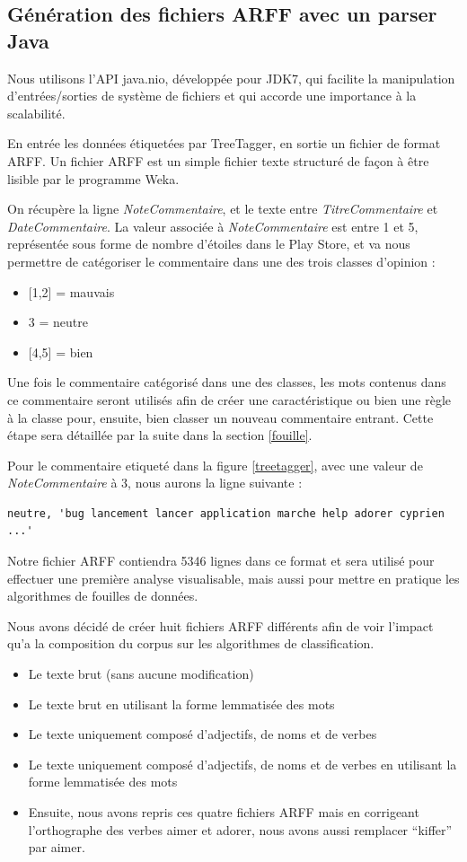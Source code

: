 \documentclass[a4paper, 11pt]{article}
\begin{document}
\subsection{Génération des fichiers ARFF avec un parser Java}
 
Nous utilisons l'API java.nio, développée pour JDK7, qui facilite la manipulation d'entrées/sorties de système de fichiers et qui accorde une importance à la scalabilité.
 
En entrée les données étiquetées par TreeTagger, en sortie un fichier de format ARFF. Un fichier ARFF est un simple fichier texte structuré de façon à être lisible par le programme Weka.

On récupère la ligne \textit{NoteCommentaire}, et le texte entre \textit{TitreCommentaire} et \textit{DateCommentaire}. La valeur associée à \textit{NoteCommentaire} est entre 1 et 5, représentée sous forme de nombre d'étoiles dans le Play Store, et va nous permettre de catégoriser le commentaire dans une des trois classes d'opinion :
\begin{itemize}
        \item{[1,2]} = mauvais
   \item{3} = neutre
   \item{[4,5]} = bien
\end{itemize}
Une fois le commentaire catégorisé dans une des classes, les mots contenus dans ce commentaire seront utilisés afin de créer une caractéristique ou bien une règle à la classe pour, ensuite, bien classer un nouveau commentaire entrant. Cette étape sera détaillée par la suite dans la section \ref{fouille}.
 
 
Pour le commentaire etiqueté dans la figure \ref{treetagger}, avec une valeur de \textit{NoteCommentaire} à 3, nous aurons la ligne suivante :
\begin{verbatim}
neutre, 'bug lancement lancer application marche help adorer cyprien ...'
\end{verbatim}
 
Notre fichier ARFF contiendra 5346 lignes dans ce format et sera utilisé pour effectuer une première analyse visualisable, mais aussi pour mettre en pratique les algorithmes de fouilles de données.

Nous avons décidé de créer huit fichiers ARFF différents afin de voir l'impact qu'a la composition du corpus sur les algorithmes de classification.

\begin{itemize}
 \item Le texte brut (sans aucune modification)
 \item Le texte brut en utilisant la forme lemmatisée des mots
 \item Le texte uniquement composé d'adjectifs, de noms et de verbes
 \item Le texte uniquement composé d'adjectifs, de noms et de verbes en utilisant la forme lemmatisée des mots
 \vspace{0.5cm}
 \item Ensuite, nous avons repris ces quatre fichiers ARFF mais en corrigeant l'orthographe des verbes aimer et adorer, nous avons aussi remplacer ``kiffer'' par aimer.
\end{itemize}
\end{document}
